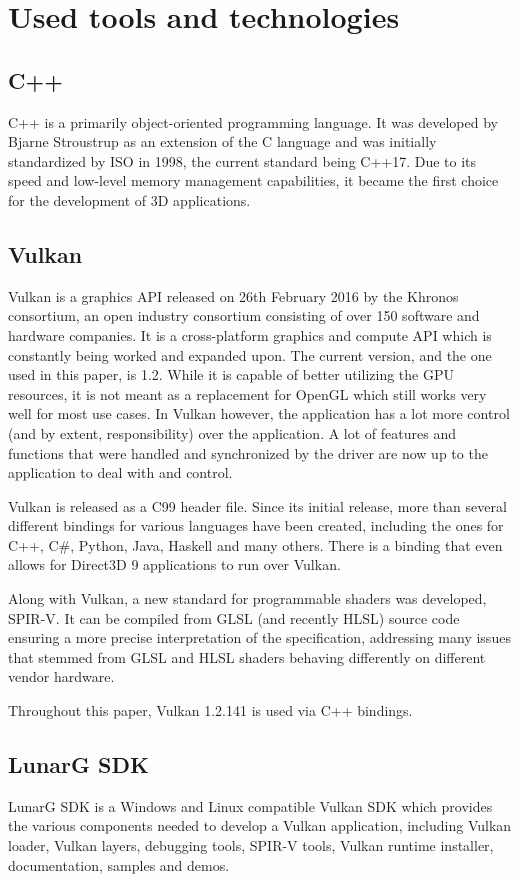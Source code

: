 \documentclass[times, utf8, zavrsni, numeric]{fer}
\begin{document}
\chapter{Used tools and technologies}
\section{C++}
C++ is a primarily object-oriented programming language. It was developed by Bjarne Stroustrup as an extension of the C language and was initially standardized by ISO in 1998, the current standard being C++17. Due to its speed and low-level memory management capabilities, it became the first choice for the development of 3D applications.

\section{Vulkan}
Vulkan \cite{vulkan_spec} is a graphics API released on 26th February 2016 by the Khronos consortium, an open industry consortium consisting of over 150 software and hardware companies. It is a cross-platform graphics and compute API which is constantly being worked and expanded upon. The current version, and the one used in this paper, is 1.2. While it is capable of better utilizing the GPU resources, it is not meant as a replacement for OpenGL which still works very well for most use cases. In Vulkan however, the application has a lot more control (and by extent, responsibility) over the application. A lot of features and functions that were handled and synchronized by the driver are now up to the application to deal with and control.

Vulkan is released as a C99 header file. Since its initial release, more than several different bindings for various languages have been created, including the ones for C++, C\#, Python, Java, Haskell and many others. There is a binding that even allows for Direct3D 9 applications to run over Vulkan.

Along with Vulkan, a new standard for programmable shaders was developed, SPIR-V. It can be compiled from GLSL (and recently HLSL) source code ensuring a more precise interpretation of the specification, addressing many issues that stemmed from GLSL and HLSL shaders behaving differently on different vendor hardware.

Throughout this paper, Vulkan 1.2.141 is used via C++ bindings.

\section{LunarG SDK}
LunarG SDK is a Windows and Linux compatible Vulkan SDK which provides the various components needed to develop a Vulkan application, including Vulkan loader, Vulkan layers, debugging tools, SPIR-V tools, Vulkan runtime installer, documentation, samples and demos.
\end{document}
